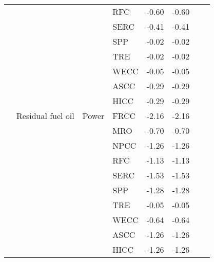 \begin{ThreePartTable}
\begin{longtable}{ >{\raggedright}p{9em} l l l l l l l }
                                                          &               &             & RFC  & -0.60   & -0.60   &         &        \\
                                                          &               &             & SERC & -0.41   & -0.41   &         &        \\
                                                          &               &             & SPP  & -0.02   & -0.02   &         &        \\
                                                          &               &             & TRE  & -0.02   & -0.02   &         &        \\
                                                          &               &             & WECC & -0.05   & -0.05   &         &        \\
                                                          &               &             & ASCC & -0.29   & -0.29   &         &        \\
                                                          &               &             & HICC & -0.29   & -0.29   &         &        \\
                                                          & Residual fuel oil& Power    & FRCC & -2.16   & -2.16   &         &        \\
                                                          &               &             & MRO  & -0.70   & -0.70   &         &        \\
                                                          &               &             & NPCC & -1.26   & -1.26   &         &        \\
                                                          &               &             & RFC  & -1.13   & -1.13   &         &        \\
                                                          &               &             & SERC & -1.53   & -1.53   &         &        \\
                                                          &               &             & SPP  & -1.28   & -1.28   &         &        \\
                                                          &               &             & TRE  & -0.05   & -0.05   &         &        \\
                                                          &               &             & WECC & -0.64   & -0.64   &         &        \\
                                                          &               &             & ASCC & -1.26   & -1.26   &         &        \\
                                                          &               &             & HICC & -1.26   & -1.26   &         &        \\
    

\end{longtable}
\end{ThreePartTable}
